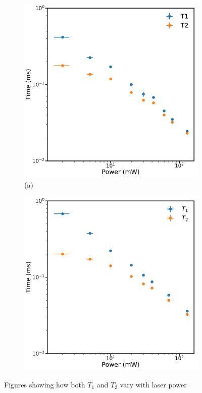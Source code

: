 \begin{figure}
\centering
\begin{subfigure}[b]{0.5\columnwidth}
\includegraphics[width = \columnwidth]{Figures/8kT1vsT21058.pdf}{(a)}
\end{subfigure}%
\begin{subfigure}[b]{0.5\columnwidth}
\includegraphics[width=\columnwidth]{Figures/T1vsT11070.pdf}
\end{subfigure}%
\caption[$T_1$ vs $T_2$ for 1058nm and 1070nm]{Figures showing how both $T_1$ and $T_2$ vary with laser power}
\label{fig:t1vst2wav}
\end{figure}
